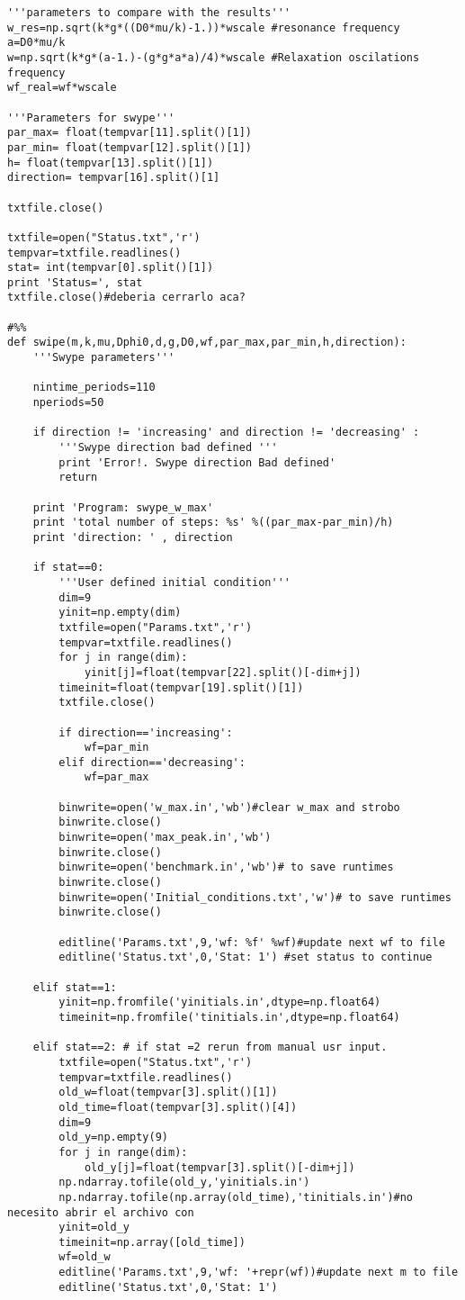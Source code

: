 \begin{lstlisting}
'''parameters to compare with the results'''
w_res=np.sqrt(k*g*((D0*mu/k)-1.))*wscale #resonance frequency
a=D0*mu/k
w=np.sqrt(k*g*(a-1.)-(g*g*a*a)/4)*wscale #Relaxation oscilations frequency
wf_real=wf*wscale

'''Parameters for swype'''
par_max= float(tempvar[11].split()[1])
par_min= float(tempvar[12].split()[1])
h= float(tempvar[13].split()[1])
direction= tempvar[16].split()[1]

txtfile.close()

txtfile=open("Status.txt",'r')
tempvar=txtfile.readlines()
stat= int(tempvar[0].split()[1])
print 'Status=', stat
txtfile.close()#deberia cerrarlo aca?    

#%%        
def swipe(m,k,mu,Dphi0,d,g,D0,wf,par_max,par_min,h,direction):
	'''Swype parameters'''
	
	nintime_periods=110
	nperiods=50
	
	if direction != 'increasing' and direction != 'decreasing' :
		'''Swype direction bad defined '''
		print 'Error!. Swype direction Bad defined'
		return
	
	print 'Program: swype_w_max'
	print 'total number of steps: %s' %((par_max-par_min)/h)
	print 'direction: ' , direction
	
	if stat==0:    
		'''User defined initial condition'''
		dim=9        
		yinit=np.empty(dim)
		txtfile=open("Params.txt",'r')
		tempvar=txtfile.readlines()
		for j in range(dim):
			yinit[j]=float(tempvar[22].split()[-dim+j])
		timeinit=float(tempvar[19].split()[1])
		txtfile.close()
		
		if direction=='increasing':
			wf=par_min   
		elif direction=='decreasing':
			wf=par_max
		
		binwrite=open('w_max.in','wb')#clear w_max and strobo
		binwrite.close()
		binwrite=open('max_peak.in','wb')
		binwrite.close()
		binwrite=open('benchmark.in','wb')# to save runtimes
		binwrite.close()
		binwrite=open('Initial_conditions.txt','w')# to save runtimes
		binwrite.close()
		
		editline('Params.txt',9,'wf: %f' %wf)#update next wf to file
		editline('Status.txt',0,'Stat: 1') #set status to continue
	
	elif stat==1:  
		yinit=np.fromfile('yinitials.in',dtype=np.float64)
		timeinit=np.fromfile('tinitials.in',dtype=np.float64)
	
	elif stat==2: # if stat =2 rerun from manual usr input.
		txtfile=open("Status.txt",'r')
		tempvar=txtfile.readlines()
		old_w=float(tempvar[3].split()[1])
		old_time=float(tempvar[3].split()[4])
		dim=9
		old_y=np.empty(9)
		for j in range(dim):
			old_y[j]=float(tempvar[3].split()[-dim+j])
		np.ndarray.tofile(old_y,'yinitials.in')
		np.ndarray.tofile(np.array(old_time),'tinitials.in')#no necesito abrir el archivo con
		yinit=old_y        
		timeinit=np.array([old_time])               
		wf=old_w
		editline('Params.txt',9,'wf: '+repr(wf))#update next m to file               
		editline('Status.txt',0,'Stat: 1')      
	

\end{lstlisting}
